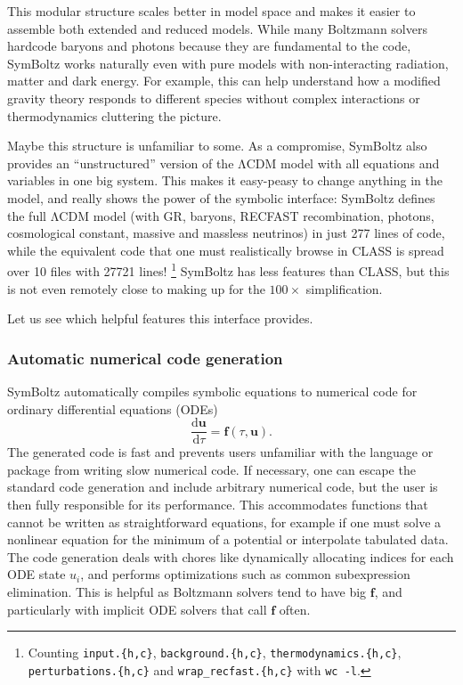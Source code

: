\documentclass{aa}
\newcommand{\LCDM}{$\mathrm{\Lambda C D M}$}
\begin{document}
This modular structure scales better in model space and makes it easier to assemble both extended and reduced models.
While many Boltzmann solvers hardcode baryons and photons because they are fundamental to the code, SymBoltz works naturally even with pure models with non-interacting radiation, matter and dark energy.
For example, this can help understand how a modified gravity theory responds to different species without complex interactions or thermodynamics cluttering the picture.

Maybe this structure is unfamiliar to some.
As a compromise, SymBoltz also provides an \enquote{unstructured} version of the \LCDM{} model with all equations and variables in one big system.
This makes it easy-peasy to change anything in the model, and really shows the power of the symbolic interface:
SymBoltz defines the full \LCDM{} model (with GR, baryons, RECFAST recombination, photons, cosmological constant, massive and massless neutrinos) in just 277 lines of code, while the equivalent code that one must realistically browse in CLASS is spread over 10 files with 27721 lines!%
\footnote{Counting \texttt{input.\{h,c\}}, \texttt{background.\{h,c\}}, \texttt{thermodynamics.\{h,c\}}, \texttt{perturbations.\{h,c\}} and \texttt{wrap\_recfast.\{h,c\}} with \texttt{wc -l}.}
SymBoltz has less features than CLASS, but this is not even remotely close to making up for the $100\times$ simplification.

Let us see which helpful features this interface provides.

\subsubsection{Automatic numerical code generation}
\label{sec:codegen}

SymBoltz automatically compiles symbolic equations to numerical code for ordinary differential equations (ODEs)
\begin{equation}
    \frac{\mathrm{d}\mathbf{u}}{\mathrm{d} \tau} = \mathbf{f}(\tau,\mathbf{u}).
    \label{eq:ode}
\end{equation}
The generated code is fast and prevents users unfamiliar with the language or package from writing slow numerical code.
If necessary, one can escape the standard code generation and include arbitrary numerical code, but the user is then fully responsible for its performance.
This accommodates functions that cannot be written as straightforward equations, for example if one must solve a nonlinear equation for the minimum of a potential or interpolate tabulated data.
The code generation deals with chores like dynamically allocating indices for each ODE state $u_i$, and performs optimizations such as common subexpression elimination.
This is helpful as Boltzmann solvers tend to have big $\boldsymbol{f}$, and particularly with implicit ODE solvers that call $\boldsymbol{f}$ often.
\end{document}
